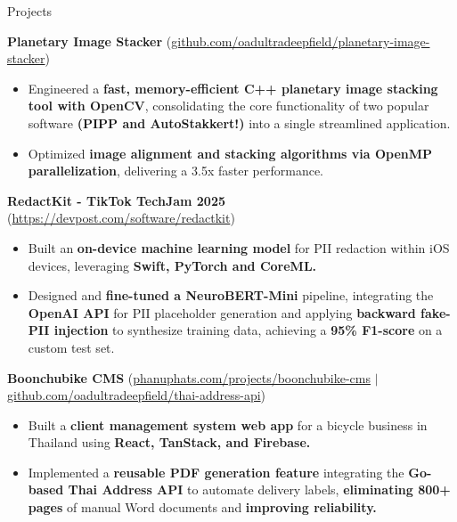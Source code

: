\documentclass{phanuphat_srisukhawasu_resume} %
\begin{document}

\begin{rSection}{Projects}

  \textbf{Planetary Image Stacker} (\href{https://github.com/oadultradeepfield/planetary-image-stacker}{github.com/oadultradeepfield/planetary-image-stacker})
  \begin{itemize}
    \item Engineered a \textbf{fast, memory-efficient C++ planetary image stacking tool with OpenCV}, consolidating the core functionality of two popular software \textbf{(PIPP and AutoStakkert!)} into a single streamlined application.
    \item Optimized \textbf{image alignment and stacking algorithms via OpenMP parallelization}, delivering a 3.5x faster performance.
  \end{itemize}

  \textbf{RedactKit - TikTok TechJam 2025} (\href{https://devpost.com/software/redactkit}{https://devpost.com/software/redactkit})
  \begin{itemize}
    \item Built an \textbf{on-device machine learning model} for PII redaction within iOS devices, leveraging \textbf{Swift, PyTorch and CoreML.}
    \item Designed and \textbf{fine-tuned a NeuroBERT-Mini} pipeline, integrating the \textbf{OpenAI API} for PII placeholder generation and applying \textbf{backward fake-PII injection} to synthesize training data, achieving a \textbf{95\% F1-score} on a custom test set.  
  \end{itemize}

  \textbf{Boonchubike CMS} (\href{https://phanuphats.com/projects/boonchubike-cms}{phanuphats.com/projects/boonchubike-cms} $|$ \href{https://github.com/oadultradeepfield/thai-address-api}{github.com/oadultradeepfield/thai-address-api})
  \begin{itemize}
    \item Built a \textbf{client management system web app} for a bicycle business in Thailand using \textbf{React, TanStack, and Firebase.}
    \item Implemented a \textbf{reusable PDF generation feature} integrating the \textbf{Go-based Thai Address API} to automate delivery labels, \textbf{eliminating 800+ pages} of manual Word documents and \textbf{improving reliability.}
  \end{itemize}

\end{rSection}
\end{document}
